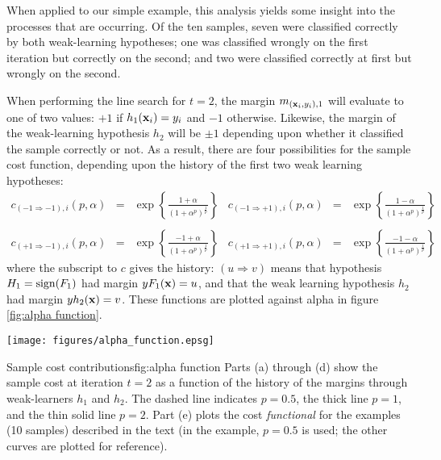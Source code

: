When applied to our simple example, this analysis yields some
insight into the processes that are occurring.  Of the ten samples,
seven were classified correctly by both weak-learning hypotheses; one
was classified wrongly on the first iteration but correctly on the
second; and two were classified correctly at first but wrongly on the
second.

When performing the line search for $t=2$, the margin $m_{(\mathbf{x}_i,
y_i), 1}$ will evaluate to one of two values: $+1$ if  $h_1(\mathbf{x}_i) =
y_i$ and $-1$ otherwise.  Likewise, the margin of the weak-learning
hypothesis $h_2$ will be $\pm 1$ depending upon whether it classified
the sample correctly or not.  As a result, there are four
possibilities for the sample cost function, depending upon the history
of the first two weak learning hypotheses: 
%
\providecommand{\ra}{\Rightarrow}
\providecommand{\Pn}{(1 + \alpha^p)^{\frac{1}{p}}}
\begin{equation}
\begin{array}{rclrcl}
c_{(-1 \ra -1),i}(p,\alpha) & = & \exp \left\{ \frac{ 1 + \alpha}{\Pn} \right\} &
c_{(-1 \ra +1),i}(p,\alpha) & = & \exp \left\{ \frac{ 1 - \alpha}{\Pn}
\right\} \\
& & & & & \\ %
c_{(+1 \ra -1),i}(p,\alpha) & = & \exp \left\{ \frac{-1 + \alpha}{\Pn} \right\} &
c_{(+1 \ra +1),i}(p,\alpha) & = & \exp \left\{ \frac{-1 - \alpha}{\Pn} \right\}
\end{array}
\end{equation}
%
where the subscript to $c$ gives the history: $(u \ra v)$ means that
hypothesis $H_1 = \mathrm{sign}(F_1)$ had margin $yF_1(\mathbf{x}) = u$, and that
the weak learning hypothesis $h_{2}$ had margin $yh_2(\mathbf{x}) =
v$. These functions are plotted against alpha in figure \ref{fig:alpha
function}. 

\begin{linefigure}
\begin{center}
\hspace*{-1cm}\texttt{[image: figures/alpha\_function.epsg]}
\end{center}
\begin{capt}{Sample cost contributions}{fig:alpha function}
Parts (a) through (d) show the sample cost at iteration $t=2$ as a
function of the history of the margins through weak-learners $h_1$ and
$h_2$.  The dashed line indicates $p=0.5$, the thick line $p=1$, and
the thin solid line $p=2$.  Part (e) plots the cost \emph{functional}
for the examples (10 samples) described in the text (in the example,
$p=0.5$ is used; the other curves are plotted for reference).
\end{capt}
\end{linefigure}

